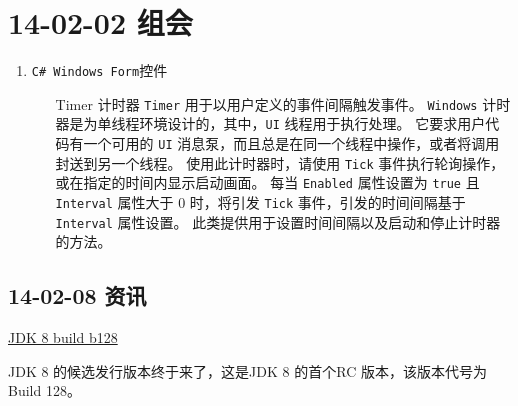 \documentclass[]{report}
\begin{document}
\section{14-02-02 组会}
\begin{enumerate}
		\item \verb|C# Windows Form|控件
		\begin{itemize}
			\item[Timer] 计时器
			\verb|Timer| 用于以用户定义的事件间隔触发事件。 \verb|Windows| 计时器是为单线程环境设计的，其中，\verb|UI| 线程用于执行处理。 它要求用户代码有一个可用的 \verb|UI| 消息泵，而且总是在同一个线程中操作，或者将调用封送到另一个线程。
			使用此计时器时，请使用 \verb|Tick| 事件执行轮询操作，或在指定的时间内显示启动画面。 每当 \verb|Enabled| 属性设置为 \verb|true| 且 \verb|Interval| 属性大于 $0$ 时，将引发 \verb|Tick| 事件，引发的时间间隔基于 \verb|Interval| 属性设置。
			此类提供用于设置时间间隔以及启动和停止计时器的方法。
		\end{itemize}
\end{enumerate}
	\subsection{14-02-08 资讯}
		\href{http://www.java.net/download/jdk8/archive/b128/binaries/jdk-8-fcs-bin-b128-windows-x64-01_feb_2014.exe}{JDK 8 build b128}
		
		JDK 8 的候选发行版本终于来了，这是JDK 8 的首个RC 版本，该版本代号为Build 128。
\end{document}

